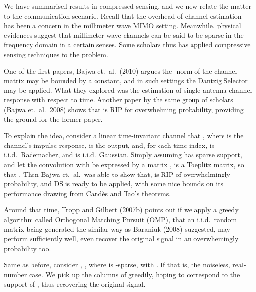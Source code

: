\color[red] {(To be done)}

\stopsection
\startsection [title={Compressed Channel Sensing}]

We have summarised results in compressed sensing, and we now relate the matter to the communication scenario.
Recall that the overhead of channel estimation has been a concern in the millimeter wave MIMO setting.
Meanwhile, physical evidences suggest that millimeter wave channels can be said to be sparse in the frequency domain in a certain senses.
Some scholars thus has applied compressive sensing techniques to the problem.

One of the first papers, Bajwa et.\ al.\ (2010) argues the -norm of the channel matrix may be bounded by a constant, and in such settings the Dantzig Selector may be applied.
What they explored was the estimation of single-antenna channel response with respect to time.
Another paper by the same group of scholars (Bajwa et.\ al.\ 2008) shows that  is RIP for overwhelming probability, providing the ground for the former paper.

To explain the idea, consider a linear time-invariant channel that , where  is the channel's impulse response,  is the output, and, for each time index,  is i.i.d.\ Rademacher, and  is i.i.d.\ Gaussian.
Simply assuming  has sparse support, and let the convolution with  be expressed by a matrix ,  is a Toeplitz matrix, so that .
Then Bajwa et.\ al.\ was able to show that,  is RIP of overwhelmingly probability, and DS is ready to be applied, with some nice bounds on its performance drawing from Cand\`es and Tao's theorems.

\stopsection
\startsection [title={Orthogonal Matching Pursuit}]

Around that time, Tropp and Gilbert (2007b) points out if we apply a greedy algorithm called Orthogonal Matching Pursuit (OMP), that an i.i.d.\ random matrix being generated the similar way as Baraniuk (2008) suggested, may perform sufficiently well, even recover the original signal in an overwhemingly probability too.

Same as before, consider , , where  is -sparse, with .
If
that is, the noiseless, real-number case.
We pick up the columns of  greedily, hoping to correspond to the support of , thus recovering the original signal.

